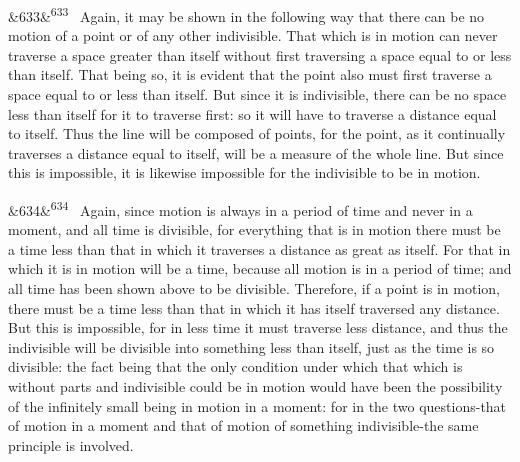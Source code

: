 \documentclass[12pt]{article}
\newcommand{\para}[1][]{\par\noindent\ifx&#1&\else\textsuperscript{\footnotesize #1}~\fi}
\begin{document}
\para[633] Again, it may be shown in the following way that there can be no motion of a point or of any other indivisible. That which is in motion can never traverse a space greater than itself without first traversing a space equal to or less than itself. That being so, it is evident that the point also must first traverse a space equal to or less than itself. But since it is indivisible, there can be no space less than itself for it to traverse first: so it will have to traverse a distance equal to itself. Thus the line will be composed of points, for the point, as it continually traverses a distance equal to itself, will be a measure of the whole line. But since this is impossible, it is likewise impossible for the indivisible to be in motion.

\para[634] Again, since motion is always in a period of time and never in a moment, and all time is divisible, for everything that is in motion there must be a time less than that in which it traverses a distance as great as itself. For that in which it is in motion will be a time, because all motion is in a period of time; and all time has been shown above to be divisible. Therefore, if a point is in motion, there must be a time less than that in which it has itself traversed any distance. But this is impossible, for in less time it must traverse less distance, and thus the indivisible will be divisible into something less than itself, just as the time is so divisible: the fact being that the only condition under which that which is without parts and indivisible could be in motion would have been the possibility of the infinitely small being in motion in a moment: for in the two questions-that of motion in a moment and that of motion of something indivisible-the same principle is involved.
\end{document}
